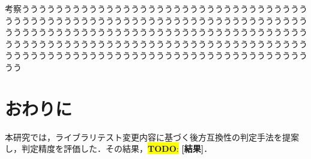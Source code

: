 \documentclass[T,J]{fose} %
\newcommand{\todo}[1]{\colorbox{yellow}{{\bf TODO}:}{\color{red} {\textbf{[#1]}}}}
\begin{document}
考察うううううううううううううううううううううううううううううううううううううううううううううううううううううううううううううううううううううううううううううううううううううううううううううううううううううううううううううううううううううううううううううううううううううううううううううううううううううううううううううううううううううううううううううううううううう

\section{おわりに}
本研究では，ライブラリテスト変更内容に基づく後方互換性の判定手法を提案し，判定精度を評価した．その結果，\todo{結果}．






\end{document}
